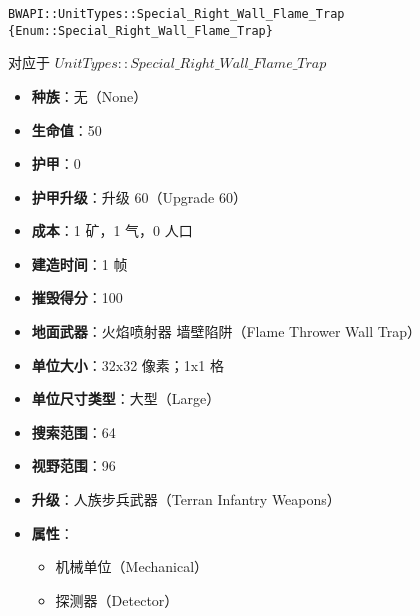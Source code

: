\begin{tcolorbox}[colback=white, colframe=black!60!white, title=Special\_Right\_Wall\_Flame\_Trap(), arc=0mm]
    \begin{verbatim}
BWAPI::UnitTypes::Special_Right_Wall_Flame_Trap {Enum::Special_Right_Wall_Flame_Trap}
    \end{verbatim}
    对应于  $UnitTypes::Special\_Right\_Wall\_Flame\_Trap$ 
    \begin{itemize}
        \item \textbf{种族}：无（None）
        \item \textbf{生命值}：50
        \item \textbf{护甲}：0
        \item \textbf{护甲升级}：升级 60（Upgrade 60）
        \item \textbf{成本}：1 矿，1 气，0 人口
        \item \textbf{建造时间}：1 帧
        \item \textbf{摧毁得分}：100
        \item \textbf{地面武器}：火焰喷射器 墙壁陷阱（Flame Thrower Wall Trap）
        \item \textbf{单位大小}：32x32 像素；1x1 格
        \item \textbf{单位尺寸类型}：大型（Large）
        \item \textbf{搜索范围}：64
        \item \textbf{视野范围}：96
        \item \textbf{升级}：人族步兵武器（Terran Infantry Weapons）
        \item \textbf{属性}：
            \begin{itemize}
                \item 机械单位（Mechanical）
                \item 探测器（Detector）
            \end{itemize}
    \end{itemize}
\end{tcolorbox}

